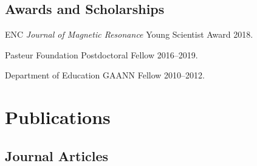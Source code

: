 \documentclass[letterpaper]{article}
\renewenvironment{itemize}{
  \begin{list}{}{
    \setlength{\leftmargin}{1.5em}
  }
}{
  \end{list}
}
\begin{document}
\subsection*{Awards and Scholarships}

\begin{itemize}
 \item ENC {\it Journal of Magnetic Resonance}
  Young Scientist Award \hfill 2018.
 \item Pasteur Foundation Postdoctoral Fellow \hfill 2016--2019.
 \item Department of Education GAANN Fellow \hfill 2010--2012.
\end{itemize}


\section*{Publications}

\subsection*{Journal Articles}



\end{document}
